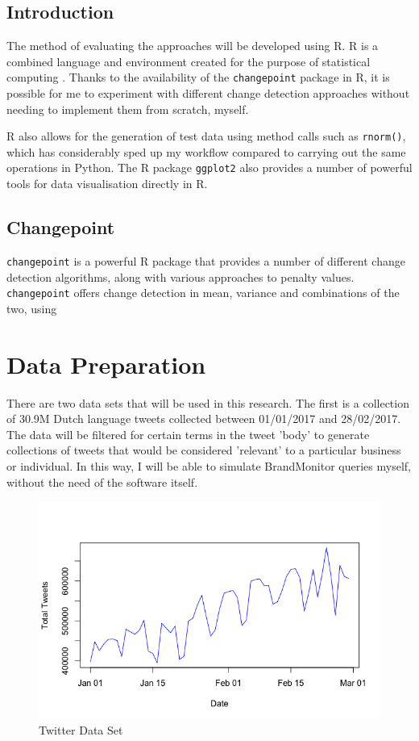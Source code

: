 \documentclass{uvamscse}	%
\begin{document}
\subsection{Introduction}

The method of evaluating the approaches will be developed using R. R is a combined language and environment created for the purpose of statistical computing \cite{RCoreTeam2017}. Thanks to the availability of the \texttt{changepoint} package in R\cite{Killick2014}, it is possible for me to experiment with different change detection approaches without needing to implement them from scratch, myself.

R also allows for the generation of test data using method calls such as \texttt{rnorm()}, which has considerably sped up my workflow compared to carrying out the same operations in Python. The R package \texttt{ggplot2} \cite{Wickham2009} also provides a number of powerful tools for data visualisation directly in R.

\subsection{Changepoint}

\texttt{changepoint} is a powerful R package that provides a number of different change detection algorithms, along with various approaches to penalty values. \texttt{changepoint} offers change detection in mean, variance and combinations of the two, using 

\section{Data Preparation}

There are two data sets that will be used in this research. The first is a collection of 30.9M Dutch language tweets collected between 01/01/2017 and 28/02/2017. The data will be filtered for certain terms in the tweet 'body' to generate collections of tweets that would be considered 'relevant' to a particular business or individual. In this way, I will be able to simulate BrandMonitor queries myself, without the need of the software itself.

\begin{figure}[hbt]
	\includegraphics[scale=0.5]{figures/twitter-totals-full.png}
	\centering
	\caption{Twitter Data Set}
	\label{fig:totals_graph}
\end{figure}
\end{document}
